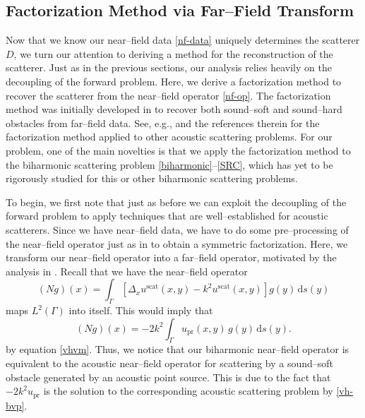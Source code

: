 \documentclass{article}
\newcommand{\dd}{\mathrm{d}}
\numberwithin{equation}{section}
\begin{document}
\subsection{Factorization Method via Far--Field Transform}\label{FM}
Now that we know our near--field data \eqref{nf-data} uniquely determines the scatterer $D$, we turn our attention to deriving a method for the reconstruction of the scatterer. Just as in the previous sections, our analysis relies heavily on the decoupling of the forward problem. Here, we derive a factorization method to recover the scatterer from the near--field operator \eqref{nf-op}. The factorization method was initially developed in \cite{firstFM} to recover both sound--soft and sound--hard obstacles from far--field data. See, e.g., \cite{fmconstant,FM-wave,FM-multifreq,regfm2,Hu-nfFM,FMgibc-obstacale} and the references therein for the factorization method applied to other acoustic scattering problems. For our problem, one of the main novelties is that we apply the factorization method to the biharmonic scattering problem \eqref{biharmonic}--\eqref{SRC}, which has yet to be rigorously studied for this or other biharmonic scattering problems. 

To begin, we first note that just as before we can exploit the decoupling of the forward problem to apply techniques that are well--established for acoustic scatterers. Since we have near--field data, we have to do some pre--processing of the near--field operator just as in \cite{nf-fft-dsm,Hu-nfFM} to obtain a symmetric factorization. Here, we transform our near--field operator into a far--field operator, motivated by the analysis in \cite{nf-fft-dsm}. Recall that we have the near--field operator 
$$(N g)(x) = \int_{\Gamma} \left[ \Delta_x u^{\text{scat}}( x , y) -k^2 u^{\text{scat}}( x , y) \right] g(y) \, \dd s(y)$$
maps $L^2(\Gamma)$ into itself. This would imply that 
$$(N g)(x) =  -2k^2 \int_{\Gamma} u_\textrm{pr} ( x , y) \, g(y) \, \dd s(y).$$
by equation \eqref{vhvm}. Thus, we notice that our biharmonic near--field operator is equivalent to the acoustic near--field operator for scattering by a sound--soft obstacle generated by an acoustic point source. This is due to the fact that $-2k^2 u_\textrm{pr}$ is the solution to the corresponding acoustic scattering problem by \eqref{vh-bvp}.
\end{document}
